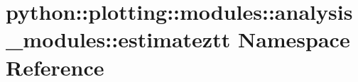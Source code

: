 \hypertarget{namespacepython_1_1plotting_1_1modules_1_1analysis__modules_1_1estimateztt}{
\section{python::plotting::modules::analysis\_\-modules::estimateztt Namespace Reference}
\label{namespacepython_1_1plotting_1_1modules_1_1analysis__modules_1_1estimateztt}
}
